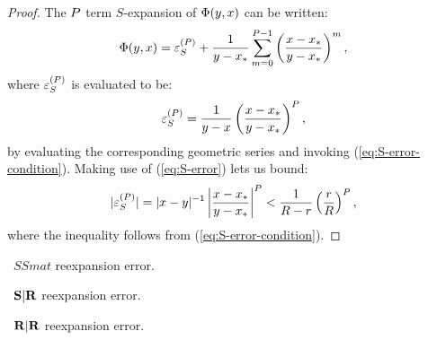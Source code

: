 \begin{proof}
  The $P$ term $S$-expansion of $\Phi(y, x)$ can be
  written:
  \begin{align}
    \label{eq:S-expansion}
    \Phi(y, x) = {\varepsilon}^{(P)}_{S} + \frac{1}{y - {x}_{*}} \sum_{m=0}^{P-1} \left(\frac{x - {x}_{*}}{y - {x}_{*}}\right)^m,
  \end{align}
  where ${\varepsilon}^{(P)}_{S}$ is evaluated to be:
  \begin{align}
    \label{eq:S-error}
    {\varepsilon}^{(P)}_{S} = \frac{1}{y - x} \left(\frac{x - {x}_{*}}{y - {x}_{*}}\right)^P,
  \end{align}
  by evaluating the corresponding geometric series and invoking
  (\ref{eq:S-error-condition}). Making use of (\ref{eq:S-error}) lets
  us bound:
  \begin{align}
    \label{eq:S-error-bound}
    |{\varepsilon}^{(P)}_{S}| = |x - y|^{-1} \left|\frac{x - {x}_{*}}{y - {x}_{*}}\right|^P < \frac{1}{R - r} \left(\frac{r}{R}\right)^P,
  \end{align}
  where the inequality follows from (\ref{eq:S-error-condition}).
\end{proof}

\begin{lemma}
  \label{lemma:SS-error}
  \TODO\ $SSmat$ reexpansion error.
\end{lemma}

\begin{lemma}
  \label{lemma:SR-error}
  \TODO\ $\bold{S}|\bold{R}$ reexpansion error.
\end{lemma}

\begin{lemma}
  \label{lemma:RR-error}
  \TODO\ $\bold{R}|\bold{R}$ reexpansion error.
\end{lemma}

